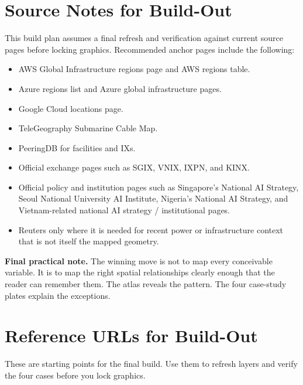 \documentclass[11pt]{article}
\begin{document}
\section{Source Notes for Build-Out}

This build plan assumes a final refresh and verification against current source pages before locking graphics. Recommended anchor pages include the following:

\begin{itemize}[leftmargin=1.4em,itemsep=0.2em]
    \item AWS Global Infrastructure regions page and AWS regions table.
    \item Azure regions list and Azure global infrastructure pages.
    \item Google Cloud locations page.
    \item TeleGeography Submarine Cable Map.
    \item PeeringDB for facilities and IXs.
    \item Official exchange pages such as SGIX, VNIX, IXPN, and KINX.
    \item Official policy and institution pages such as Singapore's National AI Strategy, Seoul National University AI Institute, Nigeria's National AI Strategy, and Vietnam-related national AI strategy / institutional pages.
    \item Reuters only where it is needed for recent power or infrastructure context that is not itself the mapped geometry.
\end{itemize}

\vspace{1em}
\noindent\colorbox{soft2}{\parbox{\dimexpr\textwidth-2\fboxsep\relax}{
\textbf{Final practical note.} The winning move is not to map every conceivable variable. It is to map the right spatial relationships clearly enough that the reader can remember them. The atlas reveals the pattern. The four case-study plates explain the exceptions.}}

\appendix
\section{Reference URLs for Build-Out}

These are starting points for the final build. Use them to refresh layers and verify the four cases before you lock graphics.
\end{document}
